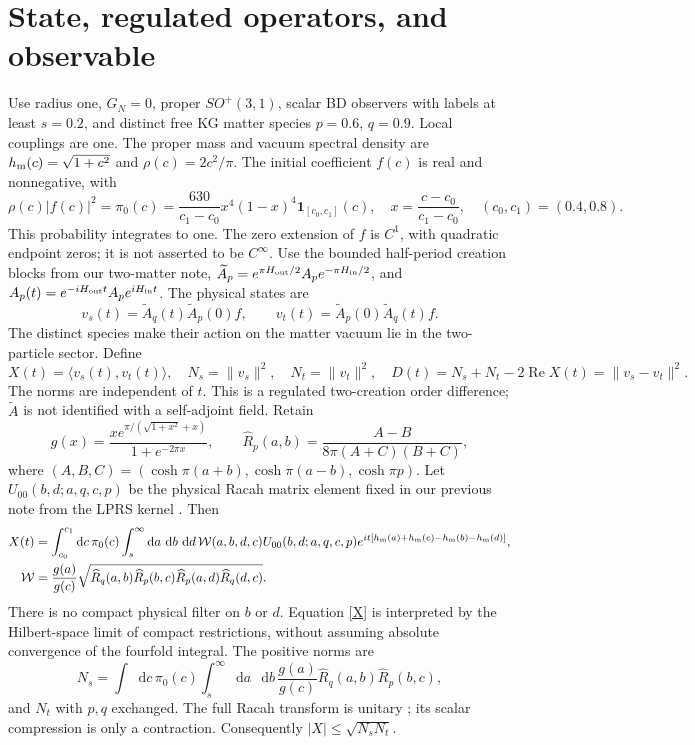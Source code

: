 \documentclass[11pt,a4paper]{article}
\newcommand{\dd}{\mathop{}\!\mathrm d}
\newcommand{\hh}{h_{\rm m}}
\newcommand{\RR}{\widehat R}
\begin{document}
\section{State, regulated operators, and observable}
Use radius one, $G_N=0$, proper $SO^+(3,1)$, scalar BD observers
with labels at least $s=0.2$, and distinct free KG matter species
$p=0.6$, $q=0.9$. Local couplings are one.
The proper mass and vacuum spectral density are
$\hh(c)=\sqrt{1+c^2}$ and $\rho(c)=2c^2/\pi$.
The initial coefficient $f(c)$ is real and nonnegative, with
\begin{equation}
 \rho(c)|f(c)|^2=\pi_0(c)
 =\frac{630}{c_1-c_0}x^4(1-x)^4\mathbf1_{[c_0,c_1]}(c),
 \quad x=\frac{c-c_0}{c_1-c_0},\quad(c_0,c_1)=(0.4,0.8).
 \label{packet}
\end{equation}
This probability integrates to one. The zero extension of $f$ is $C^1$,
with quadratic endpoint zeros; it is not asserted to be $C^\infty$.
Use the bounded half-period creation blocks from our two-matter note,
$\widetilde A_p=e^{\pi H_{\rm out}/2}A_pe^{-\pi H_{\rm in}/2}$,
and $A_p(t)=e^{-iH_{\rm out}t}A_pe^{iH_{\rm in}t}$.
The physical states are
\[
 v_s(t)=\widetilde A_q(t)\widetilde A_p(0)f,\qquad
 v_t(t)=\widetilde A_p(0)\widetilde A_q(t)f.
\]
The distinct species make their action on the matter vacuum lie in the
two-particle sector. Define
\[
 X(t)=\langle v_s(t),v_t(t)\rangle,\quad
 N_s=\|v_s\|^2,\quad N_t=\|v_t\|^2,\quad
 D(t)=N_s+N_t-2\operatorname{Re}X(t)=\|v_s-v_t\|^2.
\]
The norms are independent of $t$. This is a regulated two-creation
order difference; $\widetilde A$ is not identified with a self-adjoint field.
Retain
\[
 g(x)=\frac{x e^{\pi/(\sqrt{1+x^2}+x)}}{1+e^{-2\pi x}},\qquad
 \RR_p(a,b)=\frac{A-B}{8\pi(A+C)(B+C)},
\]
where $(A,B,C)=(\cosh\pi(a+b),\cosh\pi(a-b),\cosh\pi p)$.
Let $U_{00}(b,d;a,q,c,p)$ be the physical Racah matrix element fixed
in our previous note from the LPRS kernel \cite{lprs}. Then
\begin{align}
 X(t)&=\int_{c_0}^{c_1}\dd c\,\pi_0(c)
 \int_s^\infty\dd a\,\dd b\,\dd d\,
  {\cal W}(a,b,d,c) U_{00}(b,d;a,q,c,p)
  e^{it[\hh(a)+\hh(c)-\hh(b)-\hh(d)]}, \label{X}\\
 {\cal W}&=\frac{g(a)}{g(c)}
 \sqrt{\RR_q(a,b)\RR_p(b,c)\RR_p(a,d)\RR_q(d,c)}. \label{weight}
\end{align}
There is no compact physical filter on $b$ or $d$.
Equation \eqref{X} is interpreted by the Hilbert-space limit of compact
restrictions, without assuming absolute convergence of the fourfold integral.
The positive norms are
\[
 N_s=\int\dd c\,\pi_0(c)\int_s^\infty\dd a\,\dd b\,
          \frac{g(a)}{g(c)}\RR_q(a,b)\RR_p(b,c),
\]
and $N_t$ with $p,q$ exchanged. The full Racah transform is unitary
\cite{ds,kks}; its scalar compression is only a contraction.
Consequently $|X|\le\sqrt{N_sN_t}$.
\end{document}
